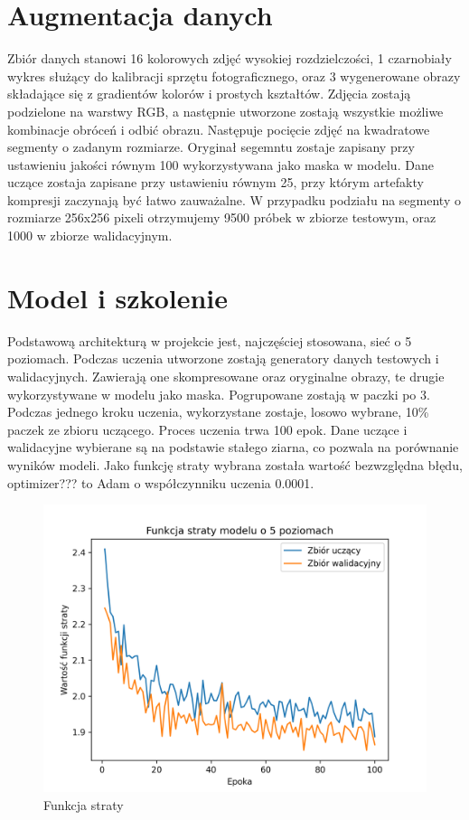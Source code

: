 \documentclass[a4paper,11pt]{article}
\begin{document}
\section{Augmentacja danych}
Zbiór danych stanowi 16 kolorowych zdjęć wysokiej rozdzielczości, 1 czarnobiały wykres służący do kalibracji sprzętu fotograficznego,
oraz 3 wygenerowane obrazy składające się z gradientów kolorów i prostych kształtów.
Zdjęcia zostają podzielone na warstwy RGB, a następnie utworzone zostają wszystkie możliwe kombinacje obróceń i odbić obrazu.
Następuje pocięcie zdjęć na kwadratowe segmenty o zadanym rozmiarze.
Oryginał segemntu zostaje zapisany przy ustawieniu jakości równym 100 wykorzystywana jako maska w modelu.
Dane uczące zostaja zapisane przy ustawieniu równym 25, przy którym artefakty kompresji zaczynają być łatwo zauważalne.
W przypadku podziału na segmenty o rozmiarze 256x256 pixeli otrzymujemy 9500 próbek w zbiorze testowym, oraz 1000 w zbiorze walidacyjnym.

\section{Model i szkolenie}
Podstawową architekturą w projekcie jest, najczęściej stosowana, sieć o 5 poziomach.
Podczas uczenia utworzone zostają generatory danych testowych i walidacyjnych.
Zawierają one skompresowane oraz oryginalne obrazy, te drugie wykorzystywane w modelu jako maska.
Pogrupowane zostają w paczki po 3.
Podczas jednego kroku uczenia, wykorzystane zostaje, losowo wybrane, 10\% paczek ze zbioru uczącego.
Proces uczenia trwa 100 epok.
Dane uczące i walidacyjne wybierane są na podstawie stałego ziarna, co pozwala na porównanie wyników modeli.
Jako funkcję straty wybrana została wartość bezwzględna błędu, optimizer??? to Adam o współczynniku uczenia 0.0001.

\begin{figure}[h!]
\begin{center}
	\includegraphics[width=0.7\columnwidth]{loss5.png}
	\caption{Funkcja straty}
\end{center}
\end{figure}
\end{document}
